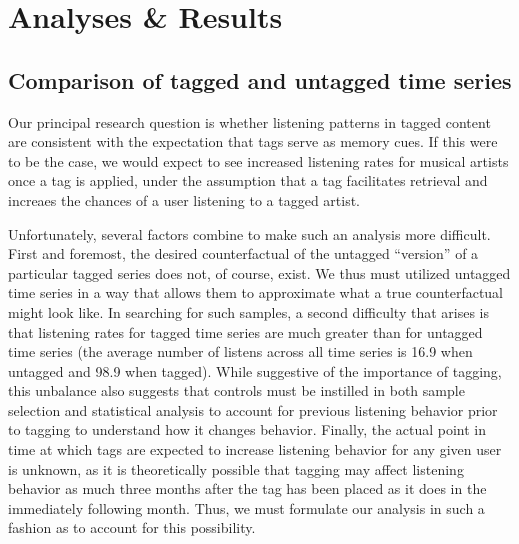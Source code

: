 \section{Analyses \& Results}
\label{sec_analyses}

\subsection{Comparison of tagged and untagged time series}
Our principal research question is whether listening patterns in tagged content are consistent with the expectation that tags serve as memory cues. If this were to be the case, we would expect to see increased listening rates for musical artists once a tag is applied, under the assumption that a tag facilitates retrieval and increaes the chances of a user listening to a tagged artist. 

Unfortunately, several factors combine to make such an analysis more difficult.  First and foremost, the desired counterfactual of the untagged ``version'' of a particular tagged series does not, of course, exist. We thus must utilized untagged time series in a way that allows them to approximate what a true counterfactual might look like.  In searching for such samples, a second difficulty that arises is that listening rates for tagged time series are much greater than for untagged time series (the average number of listens across all time series is 16.9  when untagged and 98.9 when tagged). While suggestive of the importance of tagging, this unbalance also suggests that controls must be instilled in both sample selection and statistical analysis to account for previous listening behavior prior to tagging to understand how it changes behavior.  Finally, the actual point in time at which tags are expected to increase listening behavior for any given user is unknown, as it is theoretically possible that tagging may affect listening behavior as much three months after the tag has been placed as it does in the immediately following month.  Thus, we must formulate our analysis in such a fashion as to account for this possibility.  

